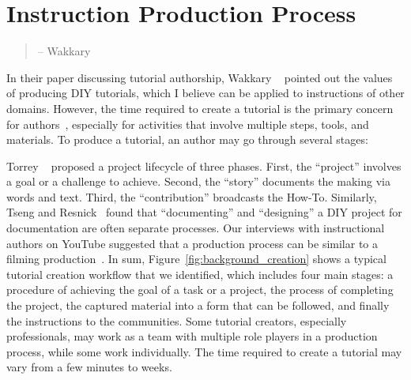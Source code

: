 




\section{Instruction Production Process}
\label{background_creation}

\begin{quote}
 -- Wakkary \ea{}~\cite{Wakkary:2015:TAH:2702123.2702550}
\end{quote}

In their paper discussing tutorial authorship, Wakkary \ea{}~\cite{Wakkary:2015:TAH:2702123.2702550} pointed out the values of producing DIY tutorials, which I believe can be applied to instructions of other domains. However, the time required to create a tutorial is the primary concern for authors~\cite{Kuznetsov:2010:REA:1868914.1868950,Tseng:2014:PVP:2598510.2598540}, especially for activities that involve multiple steps, tools, and materials. To produce a tutorial, an author may go through several stages:

Torrey \ea{}~\cite{Torrey:2007he} proposed a project lifecycle of three phases. First, the ``project'' involves a goal or a challenge to achieve. Second, the ``story'' documents the making via words and text. Third, the ``contribution'' broadcasts the How-To.
%
Similarly, Tseng and Resnick~\cite{Tseng:2014:PVP:2598510.2598540} found that ``documenting'' and ``designing'' a DIY project for documentation are often separate processes.
%
Our interviews with instructional authors on YouTube suggested that a production process can be similar to a filming production~\cite{Chi:2013:DGC:2501988.2502052}.
%
In sum, Figure~\ref{fig:background_creation} shows a typical tutorial creation workflow that we identified, which includes four main stages:  a procedure of achieving the goal of a task or a project,  the process of completing the project,  the captured material into a form that can be followed, and finally  the instructions to the communities.
%
Some tutorial creators, especially professionals, may work as a team with multiple role players in a production process, while some work individually. The time required to create a tutorial may vary from a few minutes to weeks.


